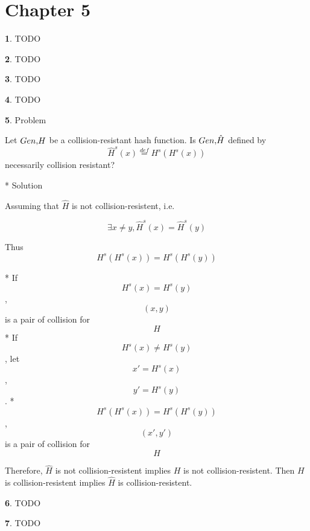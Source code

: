 \documentclass{article}
\theoremstyle{definition}
\theoremstyle{definition}
\theoremstyle{definition}
\newtheorem{solution-internal}{}[subsection]
\newenvironment{solution}{
  \begin{solution-internal}
}{
  \end{solution-internal}
}
\begin{document}
\section*{Chapter 5}
\setcounter{section}{5}
\setcounter{subsection}{5}
\setcounter{solution-internal}{0}
\begin{solution}
  TODO
\end{solution}
\begin{solution}
  TODO
\end{solution}

\begin{solution}
  TODO
\end{solution}

\begin{solution}
  TODO
\end{solution}

\begin{solution}
 Problem

Let \(Gen, $$H$$\) be a collision-resistant hash function. Is \(Gen, $$\hat H$$\) defined by$$\hat H ^s (x) \overset{def}{=} H^s(H^s(x))$$necessarily collision resistant?

* Solution

Assuming that $\hat H$ is not collision-resistent, i.e. 

$$
\exists x\neq y, \hat H^s(x) = \hat H^s(y)
$$

Thus $$H^s(H^s(x)) = H^s(H^s(y)) $$

* If $$ H^s(x) = H^s(y)$$, $$(x,y)$$ is a pair of collision for $$H$$
* If $$ H^s(x) \neq H^s(y)$$, let $$x'=H^s(x)$$, $$y'=H^s(y)$$. 
  * $$H^s(H^s(x)) = H^s(H^s(y)) $$, $$(x',y')$$ is a pair of collision for $$H$$

Therefore, $\hat H$ is not collision-resistent implies $H$ is not collision-resistent. Then $H$ is collision-resistent implies $\hat H$ is collision-resistent.

\end{solution}

\begin{solution}
  TODO
\end{solution}

\begin{solution}
  TODO
\end{solution}
\end{document}

